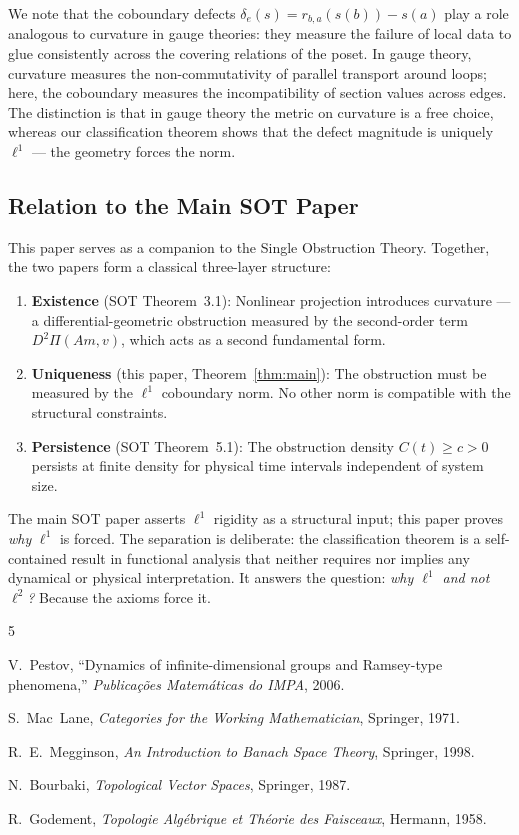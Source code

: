 \documentclass[11pt,a4paper]{amsart}
\theoremstyle{plain}
\theoremstyle{definition}
\begin{document}
We note that the coboundary defects $\delta_e(s) = r_{b,a}(s(b)) - s(a)$ play a role analogous to curvature in gauge theories: they measure the failure of local data to glue consistently across the covering relations of the poset. In gauge theory, curvature measures the non-commutativity of parallel transport around loops; here, the coboundary measures the incompatibility of section values across edges. The distinction is that in gauge theory the metric on curvature is a free choice, whereas our classification theorem shows that the defect magnitude is uniquely $\ell^1$ --- the geometry forces the norm.

\subsection{Relation to the Main SOT Paper}

This paper serves as a companion to the Single Obstruction Theory. Together, the two papers form a classical three-layer structure:

\begin{enumerate}[nosep]
  \item \textbf{Existence} (SOT Theorem~3.1): Nonlinear projection introduces curvature --- a differential-geometric obstruction measured by the second-order term $D^2\Pi(Am, v)$, which acts as a second fundamental form.
  \item \textbf{Uniqueness} (this paper, Theorem~\ref{thm:main}): The obstruction must be measured by the $\ell^1$ coboundary norm. No other norm is compatible with the structural constraints.
  \item \textbf{Persistence} (SOT Theorem~5.1): The obstruction density $C(t) \geq c > 0$ persists at finite density for physical time intervals independent of system size.
\end{enumerate}

The main SOT paper asserts $\ell^1$ rigidity as a structural input; this paper proves \emph{why} $\ell^1$ is forced. The separation is deliberate: the classification theorem is a self-contained result in functional analysis that neither requires nor implies any dynamical or physical interpretation. It answers the question: \emph{why $\ell^1$ and not $\ell^2$?} Because the axioms force it.

\begin{thebibliography}{5}

V.~Pestov, ``Dynamics of infinite-dimensional groups and Ramsey-type phenomena,'' \emph{Publica\c{c}\~{o}es Matem\'{a}ticas do IMPA}, 2006.

S.~Mac~Lane, \emph{Categories for the Working Mathematician}, Springer, 1971.

R.~E.~Megginson, \emph{An Introduction to Banach Space Theory}, Springer, 1998.

N.~Bourbaki, \emph{Topological Vector Spaces}, Springer, 1987.

R.~Godement, \emph{Topologie Alg\'{e}brique et Th\'{e}orie des Faisceaux}, Hermann, 1958.

\end{thebibliography}
\end{document}
